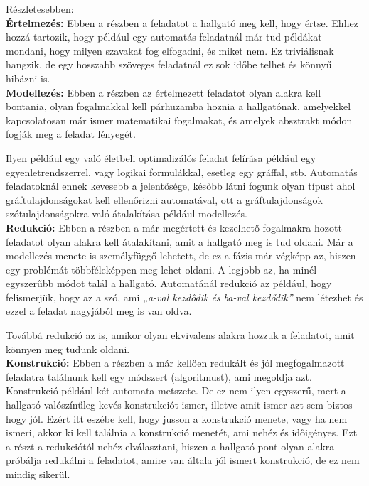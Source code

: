 \documentclass[12pt]{report}
\theoremstyle{definition}
\begin{document}
Részletesebben:\\

\textbf{Értelmezés:} Ebben a részben a feladatot a hallgató meg kell, hogy értse. Ehhez hozzá tartozik, hogy például egy automatás feladatnál már tud példákat mondani, hogy milyen szavakat fog elfogadni, és miket nem. Ez triviálisnak hangzik, de egy hosszabb szöveges feladatnál ez sok időbe telhet és könnyű hibázni is.\\

\textbf{Modellezés:} Ebben a részben az értelmezett feladatot olyan alakra kell bontania, olyan fogalmakkal kell párhuzamba hoznia a hallgatónak, amelyekkel kapcsolatosan már ismer matematikai fogalmakat, és amelyek absztrakt módon fogják meg a feladat lényegét.

Ilyen például egy való életbeli optimalizálós feladat felírása például egy egyenletrendszerrel, vagy logikai formulákkal, esetleg egy gráffal, stb. Automatás feladatoknál ennek kevesebb a jelentősége, később látni fogunk olyan típust ahol gráftulajdonságokat kell ellenőrizni automatával, ott a gráftulajdonságok szótulajdonságokra való átalakítása például modellezés.\\

\textbf{Redukció:} Ebben a részben a már megértett és kezelhető fogalmakra hozott feladatot olyan alakra kell átalakítani, amit a hallgató meg is tud oldani. Már a modellezés menete is személyfüggő lehetett, de ez a fázis már végképp az, hiszen egy problémát többféleképpen meg lehet oldani. A legjobb az, ha minél egyszerűbb módot talál a hallgató. Automatánál redukció az például, hogy felismerjük, hogy az a szó, ami \textit{„a-val kezdődik és ba-val kezdődik”} nem létezhet és ezzel a feladat nagyjából meg is van oldva.

Továbbá redukció az is, amikor olyan ekvivalens alakra hozzuk a feladatot, amit könnyen meg tudunk oldani.\\

\textbf{Konstrukció:} Ebben a részben a már kellően redukált és jól megfogalmazott feladatra találnunk kell egy módszert (algoritmust), ami megoldja azt. Konstrukció például két automata metszete. De ez nem ilyen egyszerű, mert a hallgató valószínűleg kevés konstrukciót ismer, illetve amit ismer azt sem biztos hogy jól. Ezért itt eszébe kell, hogy jusson a konstrukció menete, vagy ha nem ismeri, akkor ki kell találnia a konstrukció menetét, ami nehéz és időigényes. Ezt a részt a redukciótól nehéz elválasztani, hiszen a hallgató pont olyan alakra próbálja redukálni a feladatot, amire van általa jól ismert konstrukció, de ez nem mindig sikerül.\\
\end{document}
